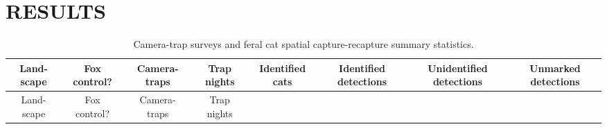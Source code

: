 \documentclass[]{elsarticle} %
\begin{document}
\newpage

\hypertarget{results}{%
\section{RESULTS}\label{results}}

\begin{longtable}[]{@{}cccccccc@{}}
\caption{\label{tab:sstab} Camera-trap surveys and feral cat spatial capture-recapture summary statistics.}\tabularnewline
\toprule
\begin{minipage}[b]{0.07\columnwidth}\centering
Land- scape\strut
\end{minipage} & \begin{minipage}[b]{0.08\columnwidth}\centering
Fox control?\strut
\end{minipage} & \begin{minipage}[b]{0.08\columnwidth}\centering
Camera- traps\strut
\end{minipage} & \begin{minipage}[b]{0.07\columnwidth}\centering
Trap nights\strut
\end{minipage} & \begin{minipage}[b]{0.09\columnwidth}\centering
Identified cats\strut
\end{minipage} & \begin{minipage}[b]{0.13\columnwidth}\centering
Identified detections\strut
\end{minipage} & \begin{minipage}[b]{0.14\columnwidth}\centering
Unidentified detections\strut
\end{minipage} & \begin{minipage}[b]{0.12\columnwidth}\centering
Unmarked detections\strut
\end{minipage}\tabularnewline
\midrule
\endfirsthead
\toprule
\begin{minipage}[b]{0.07\columnwidth}\centering
Land- scape\strut
\end{minipage} & \begin{minipage}[b]{0.08\columnwidth}\centering
Fox control?\strut
\end{minipage} & \begin{minipage}[b]{0.08\columnwidth}\centering
Camera- traps\strut
\end{minipage} & \begin{minipage}[b]{0.07\columnwidth}\centering
Trap nights\strut
\end{minipage} & \begin{minipage}[b]{0.09\columnwidth}\centering

\end{minipage}
\end{longtable}
\end{document}
